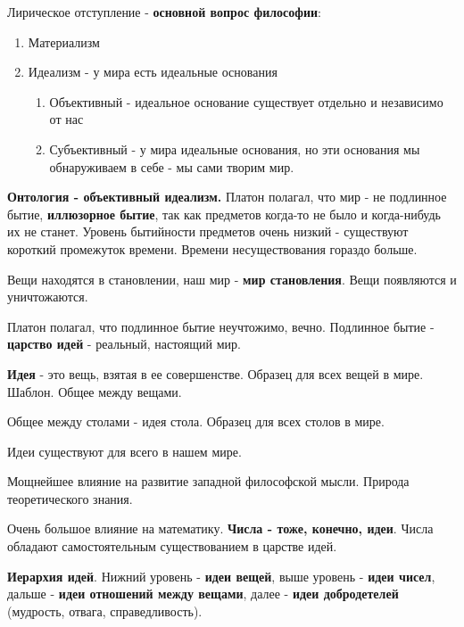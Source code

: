 \documentclass{article}
\begin{document}
\begin{flushleft}
\hfill

Лирическое отступление - \textbf{основной вопрос философии}:

\begin{enumerate}
    \item Материализм
    \item Идеализм - у мира есть идеальные основания
    \begin{enumerate}
        \item Объективный - идеальное основание существует отдельно и независимо от нас
        \item Субъективный - у мира идеальные основания, но эти основания мы обнаруживаем в себе - мы сами творим мир.
    \end{enumerate}
\end{enumerate}

\hfill

\textbf{Онтология - объективный идеализм.} Платон полагал, что мир - не подлинное бытие, \textbf{иллюзорное бытие}, так как предметов когда-то не было и когда-нибудь их не станет. Уровень бытийности предметов очень низкий - существуют короткий промежуток времени. Времени несуществования гораздо больше.

Вещи находятся в становлении, наш мир - \textbf{мир становления}. Вещи появляются и уничтожаются.

Платон полагал, что подлинное бытие неучтожимо, вечно. Подлинное бытие - \textbf{царство идей} - реальный, настоящий мир.

\hfill

\textbf{Идея} - это вещь, взятая в ее совершенстве. Образец для всех вещей в мире. Шаблон. Общее между вещами.

Общее между столами - идея стола. Образец для всех столов в мире.

Идеи существуют для всего в нашем мире.

\hfill

Мощнейшее влияние на развитие западной философской мысли. Природа теоретического знания.

\hfill

Очень большое влияние на математику. \textbf{Числа - тоже, конечно, идеи}. Числа обладают самостоятельным существованием в царстве идей.

\hfill

\textbf{Иерархия идей}. Нижний уровень - \textbf{идеи вещей}, выше уровень - \textbf{идеи чисел}, дальше - \textbf{идеи отношений между вещами}, далее - \textbf{идеи добродетелей} (мудрость, отвага, справедливость).


\end{flushleft}
\end{document}
